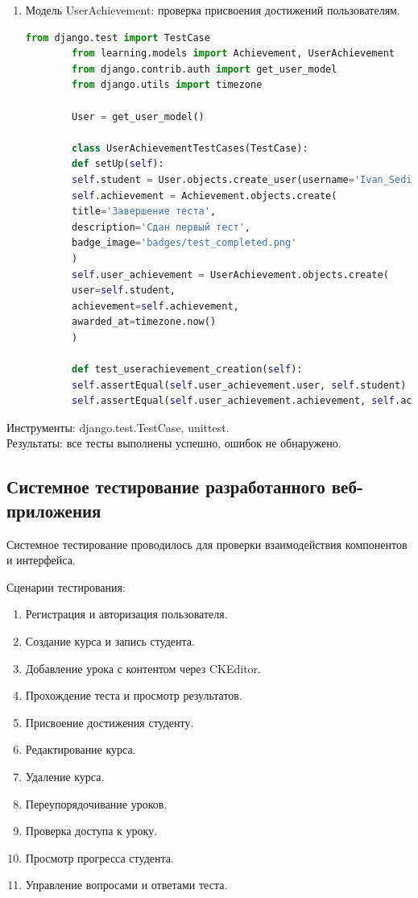 \begin{enumerate}
	\item Модель UserAchievement: проверка присвоения достижений пользователям.
	\begin{lstlisting}[language=Python, caption=Модульный тест для UserAchievement, label=lst:userachievement_test]
		from django.test import TestCase
		from learning.models import Achievement, UserAchievement
		from django.contrib.auth import get_user_model
		from django.utils import timezone
		
		User = get_user_model()
		
		class UserAchievementTestCases(TestCase):
		def setUp(self):
		self.student = User.objects.create_user(username='Ivan_Sedih', password='vanya232323', is_student=True)
		self.achievement = Achievement.objects.create(
		title='Завершение теста',
		description='Сдан первый тест',
		badge_image='badges/test_completed.png'
		)
		self.user_achievement = UserAchievement.objects.create(
		user=self.student,
		achievement=self.achievement,
		awarded_at=timezone.now()
		)
		
		def test_userachievement_creation(self):
		self.assertEqual(self.user_achievement.user, self.student)
		self.assertEqual(self.user_achievement.achievement, self.achievement)
	\end{lstlisting}
\end{enumerate}

Инструменты: django.test.TestCase, unittest.\\
Результаты: все тесты выполнены успешно, ошибок не обнаружено.


\subsection{Системное тестирование разработанного веб-приложения}

Системное тестирование проводилось для проверки взаимодействия компонентов и интерфейса.

Сценарии тестирования:
	\begin{enumerate}
	\item Регистрация и авторизация пользователя.
	\item Создание курса и запись студента.
	\item Добавление урока с контентом через CKEditor.
	\item Прохождение теста и просмотр результатов.
	\item Присвоение достижения студенту.
	\item Редактирование курса.
	\item Удаление курса.
	\item Переупорядочивание уроков.
	\item Проверка доступа к уроку.
	\item Просмотр прогресса студента.
	\item Управление вопросами и ответами теста.
	\end{enumerate}


